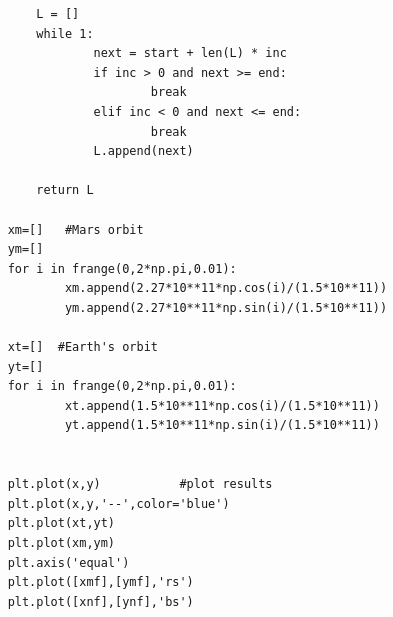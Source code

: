 \documentclass[twocolumn,12pt,a4paper]{article}
\numberwithin{equation}{section}
\begin{document}
\begin{verbatim}
		L = []
		while 1:
				next = start + len(L) * inc
				if inc > 0 and next >= end:
						break
				elif inc < 0 and next <= end:
						break
				L.append(next)
	
		return L
	
	xm=[]   #Mars orbit
	ym=[]
	for i in frange(0,2*np.pi,0.01):
			xm.append(2.27*10**11*np.cos(i)/(1.5*10**11))
			ym.append(2.27*10**11*np.sin(i)/(1.5*10**11))
	
	xt=[]  #Earth's orbit
	yt=[]
	for i in frange(0,2*np.pi,0.01):
			xt.append(1.5*10**11*np.cos(i)/(1.5*10**11))
			yt.append(1.5*10**11*np.sin(i)/(1.5*10**11))
	
	
	plt.plot(x,y)			#plot results
	plt.plot(x,y,'--',color='blue')
	plt.plot(xt,yt)
	plt.plot(xm,ym)
	plt.axis('equal')
	plt.plot([xmf],[ymf],'rs')
	plt.plot([xnf],[ynf],'bs')

	
\end{verbatim}
\end{document}
